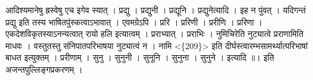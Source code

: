 आदिश्यमानेषु ह्रस्वेषु एच इगेव स्यात् । प्रद्यु । प्रद्युनी । प्रद्यूनि
। प्रद्युनेत्यादि । इह न पुंवत् । यदिगन्तं प्रद्यु इति तस्य
भाषितपुंस्कत्वाऽभावात् । एवमग्रेऽपि । प्ररि । प्ररिणी । प्ररीणि ।
प्ररिणा । एकदेशविकृतस्याऽनन्यत्वात् रायो हलि इत्यात्वम् । प्रराभ्यात् ।
प्रराभिः । नुमिचिरेति नुट्यात्वे प्रराणामिति माधवः । वस्तुतस्तु
संनिपातपरिभाषया नुट्यात्वं न । नामि \textless{}\{209\}\textgreater{} इति
दीर्घस्त्वारम्भसामर्थ्यात्परिभाषां बाधत इत्युक्तम् । प्ररीणाम् । सुनु ।
सुनुनी । सुनूनि । सुनुना । सुनुने । इत्यादि ॥। इति
अजन्तपुल्लिङ्गप्रकरणम्‌ ।
